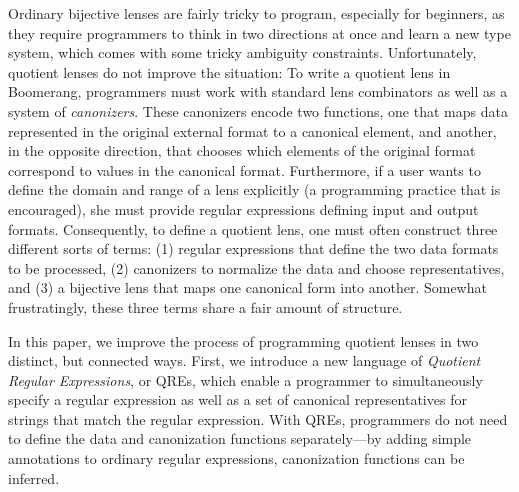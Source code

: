 \documentclass[acmsmall,review,anonymous]{acmart}
\begin{document}
Ordinary bijective lenses are fairly tricky to program, especially for
beginners, as they require programmers to think in two directions at once
and learn a new type system, which comes with some tricky ambiguity constraints.
Unfortunately, quotient lenses do not improve the situation:  To
write a quotient lens in Boomerang, programmers must work with standard lens
combinators as well as a system of \emph{canonizers}.
These canonizers encode two functions, one that
maps data represented in the original external format
to a canonical element, and another, in the opposite direction, that chooses
which elements of the original format correspond to values in the canonical
format. Furthermore, if a user wants to define the domain and range of
a lens explicitly (a programming practice that is encouraged), she must
provide regular expressions defining input and output formats.
Consequently, to define a quotient lens, one must often
construct three different sorts
of terms: (1) regular expressions that define the two data formats
to be processed, (2) canonizers to normalize the data
and choose representatives, and (3) a bijective lens that maps
one canonical form into another.  Somewhat frustratingly,
these three terms share a fair amount of structure.

In this paper, we improve the process of programming quotient lenses
in two distinct, but connected ways. First, we
introduce a new language of {\em Quotient Regular Expressions}, or QREs, which
enable a programmer to simultaneously specify a regular expression as well as
a set of canonical representatives for strings that match the regular
expression. With
QREs, programmers do not need to define the data and canonization functions
separately---by adding simple annotations to ordinary regular expressions,
canonization functions can be inferred.
\end{document}
